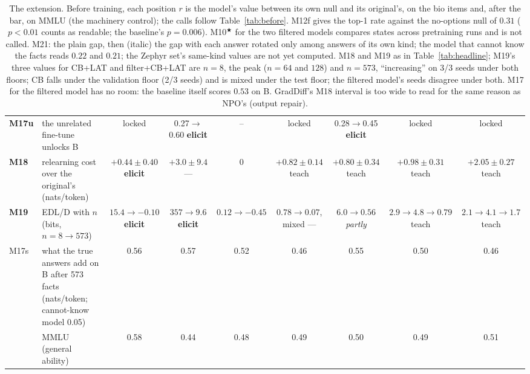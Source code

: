 \documentclass[11pt]{article}
\newcommand{\el}[1]{#1 \textbf{elicit}}
\newcommand{\pa}[1]{#1 \emph{partly}}
\newcommand{\te}[1]{#1 teach}
\newcommand{\na}[1]{#1 ---}
\begin{document}
\begin{table}[!htbp]
\begin{adjustbox}{max width=\textwidth}
\begin{tabular}{@{}l>{\raggedright}p{4.1cm}cc|ccccc@{}}
\textbf{M17u} & the unrelated fine-tune unlocks B & locked & \el{0.27$\to$0.60} & -- & locked & \el{0.28$\to$0.45} & locked & locked \tabularnewline
\textbf{M18} & relearning cost over the original's (nats/token) & \el{$+0.44\pm0.40$} & \na{$+3.0\pm9.4$} & 0 & \te{$+0.82\pm0.14$} & \te{$+0.80\pm0.34$} & \te{$+0.98\pm0.31$} & \te{$+2.05\pm0.27$} \tabularnewline
\textbf{M19} & EDL/D with $n$ (bits, $n{=}8\to573$) & \el{$15.4\to-0.10$} & \el{$357\to9.6$} & $0.12\to-0.45$ & \na{$0.78\to0.07$, mixed} & \pa{$6.0\to0.56$} & \te{$2.9\to4.8\to0.79$} & \te{$2.1\to4.1\to1.7$} \tabularnewline
M17s & what the true answers add on B after 573 facts (nats/token; cannot-know model 0.05) & 0.56 & 0.57 & 0.52 & 0.46 & 0.55 & 0.50 & 0.46 \tabularnewline
 & MMLU (general ability) & 0.58 & 0.44 & 0.48 & 0.49 & 0.50 & 0.49 & 0.51 \tabularnewline
\bottomrule
\end{tabular}
\end{adjustbox}
\caption{The extension. Before training, each position $r$ is the model's value between its own
null and its original's, on the bio items and, after the bar, on MMLU (the machinery control); the
calls follow Table~\ref{tab:before}. M12f gives the top-1 rate against the no-options null of
$0.31$ ($p<0.01$ counts as readable; the baseline's $p=0.006$). M10$^\bigstar$ for the two filtered
models compares states across pretraining runs and is not called. M21: the plain gap, then (italic)
the gap with each answer rotated only among answers of its own kind; the model that cannot know the
facts reads $0.22$ and $0.21$; the Zephyr set's same-kind values are not yet computed. M18 and M19 as
in Table~\ref{tab:headline}; M19's three values for CB+LAT and filter+CB+LAT are $n=8$, the peak
($n=64$ and $128$) and $n=573$, ``increasing'' on 3/3 seeds under both floors; CB falls under the
validation floor (2/3 seeds) and is mixed under the test floor; the filtered model's seeds disagree
under both. M17 for the filtered model has no room: the baseline itself scores $0.53$ on B. GradDiff's M18 interval is too wide to read for the same reason as NPO's (output repair).}
\label{tab:sota}
\end{table}
\end{document}
